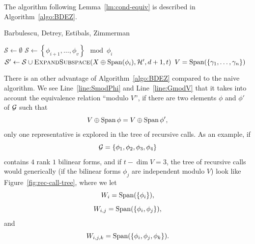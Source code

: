 The algorithm following Lemma~\ref{lm:cond-equiv} is described in
Algorithm~\ref{algo:BDEZ}.
\begin{algorithm}
  \caption{Barbulescu, Detrey, Estibals, Zimmerman}
  \label{algo:BDEZ}
  \begin{algorithmic}[1]

    \State {}
    \Else
    \State $\mathcal S\gets\emptyset$
      \State\label{line:SmodPhi} $\mathcal S\gets \left\{ \phi_{i+1}, \dots, \phi_v
  \right\}\mod\phi_i$
    \State $\mathcal S'\gets\mathcal
    S\cup\Call{ExpandSubspace}{X\oplus\Span(\phi_i), \mathcal H', d+1, t}$
    \EndFor
    \State {}
    \EndIf
    \EndFunction
    \State $V=\operatorname{Span}(\left\{ \gamma_1, \dots, \gamma_n \right\})$
    \State\label{line:GmodV} 
  \end{algorithmic}
\end{algorithm}
There is an other advantage of Algorithm~\ref{algo:BDEZ} compared to the naive
algorithm. We see Line~\ref{line:SmodPhi} and Line~\ref{line:GmodV} that it
takes into account the equivalence relation ``modulo $V$'', \ie if there are two
elements $\phi$ and $\phi'$ of $\mathcal{G}$ such that 
\[
  V\oplus\operatorname{Span}\phi=V\oplus\operatorname{Span}\phi',
\]
only one representative is explored in the tree of recursive calls. As an
example, if
\[
  \mathcal{G} = \left\{ \phi_1, \phi_2, \phi_3, \phi_4 \right\}
\]
contains $4$ rank $1$ bilinear forms, and if $t - \dim V = 3$, the tree of
recursive calls would generically (\eg if the bilinear forms $\phi_j$ are
independent modulo $V$) look like Figure~\ref{fig:rec-call-tree}, where we let
\[
  W_{i} = \operatorname{Span}(\left\{ \phi_i\right\}),
\]
\[
  W_{i, j} = \operatorname{Span}(\left\{ \phi_i, \phi_j\right\}),
\]
and
\[
  W_{i, j, k} = \operatorname{Span}(\left\{ \phi_i, \phi_j, \phi_k \right\}).
\]
